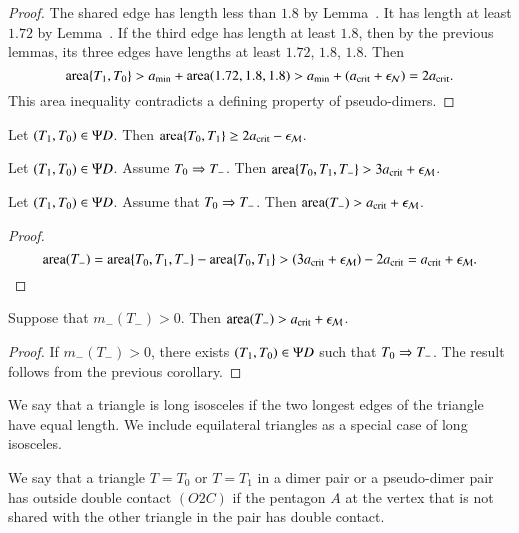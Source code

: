 \begin{proof}
  The shared edge has length less than $1.8$ by
  Lemma~.  It has length at least $1.72$ by
  Lemma~.  If the third edge has length at least $1.8$,
  then by the previous lemmas, its three edges have lengths at least
  $1.72$, $1.8$, $1.8$.  Then
\[
{\operatorname{area}}\{T_1,T_0\} > a_\text{min} + {\operatorname{area}}(1.72,1.8,1.8) > a_\text{min} + (a_\text{crit} + \epsilon_{\mathcal N}) = 2a_\text{crit}.
\]
This area inequality contradicts a defining property of pseudo-dimers.
\end{proof}

\begin{lemma}
Let $(T_1,T_0)\in\Psi D$.  Then ${\operatorname{area}}\{T_0,T_1\} \ge 2a_\text{crit} - \epsilon_{\mathcal M}$.
\end{lemma}

\begin{lemma}
Let $(T_1,T_0)\in\Psi D$. Assume $T_0\Rightarrow T_-$.  
Then ${\operatorname{area}}\{T_0,T_1,T_-\} > 3a_\text{crit} + \epsilon_{\mathcal M}$.
\end{lemma}

\begin{corollary} 
Let $(T_1,T_0)\in\Psi D$.  Assume that $T_0\Rightarrow T_-$.  Then
${\operatorname{area}}(T_-) > a_\text{crit}+\epsilon_{\mathcal M}$.
\end{corollary}

\begin{proof}  
\[
{\operatorname{area}}(T_-) = {\operatorname{area}}\{T_0,T_1,T_-\} - {\operatorname{area}}\{T_0,T_1\} 
> (3a_\text{crit} + \epsilon_{\mathcal M}) - 2a_\text{crit} = a_\text{crit} + \epsilon_{\mathcal M}.
\]
\end{proof}

\begin{corollary}
  Suppose that $m_-(T_-)>0$.  Then ${\operatorname{area}}(T_-) > a_\text{crit} + \epsilon_{\mathcal M}$.
\end{corollary}

\begin{proof} 
  If $m_-(T_-)>0$, there exists $(T_1,T_0)\in\Psi D$ such that $T_0\Rightarrow
  T_-$.  The result follows from the previous corollary.
\end{proof}


\begin{definition}
  We say that a triangle is long isosceles if the two longest edges of
  the triangle have equal length.  We include equilateral triangles as
  a special case of long isosceles.
\end{definition}

\begin{definition}[O2C]
  We say that a triangle $T=T_0$ or $T=T_1$ in a dimer pair or a
  pseudo-dimer pair has outside double contact $(O2C)$ if the pentagon
  $A$ at the vertex that is not shared with the other triangle in the
  pair has double contact.
\end{definition}

